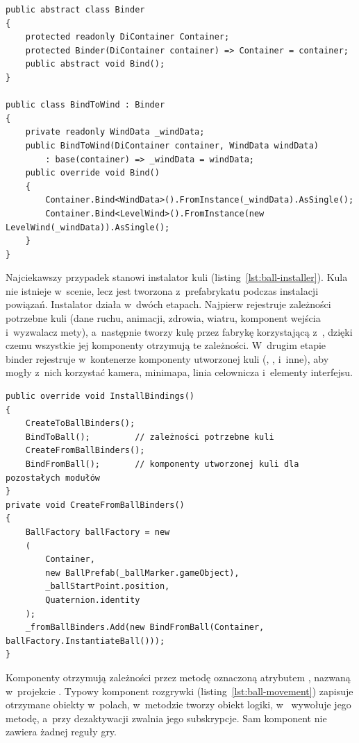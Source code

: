 \begin{lstlisting}[caption={Klasa bazowa binderów i~binder rejestrujący wiatr; \zrodloWlasne},label=lst:binder]
public abstract class Binder
{
    protected readonly DiContainer Container;
    protected Binder(DiContainer container) => Container = container;
    public abstract void Bind();
}

public class BindToWind : Binder
{
    private readonly WindData _windData;
    public BindToWind(DiContainer container, WindData windData)
        : base(container) => _windData = windData;
    public override void Bind()
    {
        Container.Bind<WindData>().FromInstance(_windData).AsSingle();
        Container.Bind<LevelWind>().FromInstance(new LevelWind(_windData)).AsSingle();
    }
}
\end{lstlisting}

Najciekawszy przypadek stanowi instalator kuli (listing~\ref{lst:ball-installer}).
Kula nie istnieje w~scenie, lecz jest tworzona z~prefabrykatu podczas instalacji
powiązań. Instalator działa w~dwóch etapach. Najpierw rejestruje zależności potrzebne
kuli (dane ruchu, animacji, zdrowia, wiatru, komponent wejścia i~wyzwalacz mety),
a~następnie tworzy kulę przez fabrykę korzystającą z~,
dzięki czemu wszystkie jej komponenty otrzymują te zależności. W~drugim etapie binder
 rejestruje w~kontenerze komponenty utworzonej kuli
(, ,  i~inne), aby mogły
z~nich korzystać kamera, minimapa, linia celownicza i~elementy interfejsu.

\begin{lstlisting}[caption={Dwuetapowa instalacja powiązań kuli w~klasie BallInstaller; \zrodloWlasne},label=lst:ball-installer]
public override void InstallBindings()
{
    CreateToBallBinders();
    BindToBall();         // zależności potrzebne kuli
    CreateFromBallBinders();
    BindFromBall();       // komponenty utworzonej kuli dla pozostałych modułów
}
private void CreateFromBallBinders()
{
    BallFactory ballFactory = new
    (
        Container,
        new BallPrefab(_ballMarker.gameObject),
        _ballStartPoint.position,
        Quaternion.identity
    );
    _fromBallBinders.Add(new BindFromBall(Container, ballFactory.InstantiateBall()));
}
\end{lstlisting}

Komponenty  otrzymują zależności przez metodę oznaczoną atrybutem
\kod{[Inject]}, nazwaną w~projekcie . Typowy komponent rozgrywki
(listing~\ref{lst:ball-movement}) zapisuje otrzymane obiekty w~polach, w~metodzie
 tworzy obiekt logiki, w~ wywołuje jego metodę, a~przy
dezaktywacji zwalnia jego subskrypcje. Sam komponent nie zawiera żadnej reguły gry.

